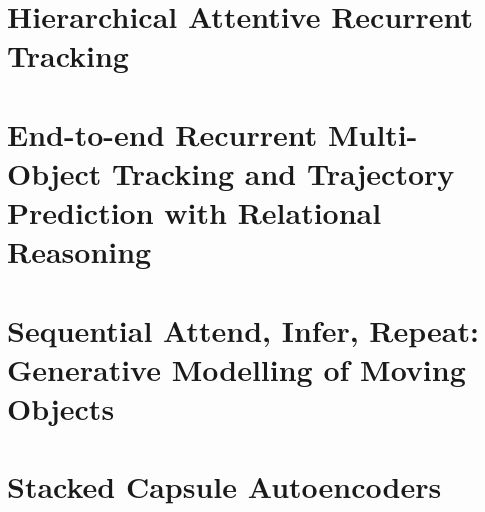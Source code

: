 \documentclass[a4paper,twoside]{ociamthesis}
\renewcommand{\cite}[1]{\citet{#1}}
\newcommand*{\bibtitle}{References}
\begin{document}
%
%




\chapter{Hierarchical Attentive Recurrent Tracking}
\label{ch:hart}
 







\chapter{End-to-end Recurrent Multi-Object Tracking and Trajectory Prediction with Relational Reasoning}
\label{ch:mohart}


\chapter{Sequential Attend, Infer, Repeat: Generative Modelling of Moving Objects}
\label{ch:sqair}


\chapter{Stacked Capsule Autoencoders}
\label{ch:sca}





%
%


%




\setlength{\baselineskip}{0pt} %

{\renewcommand*\MakeUppercase[1]{#1}%
\printbibliography[heading=bibintoc,title={\bibtitle}]}
\end{document}
